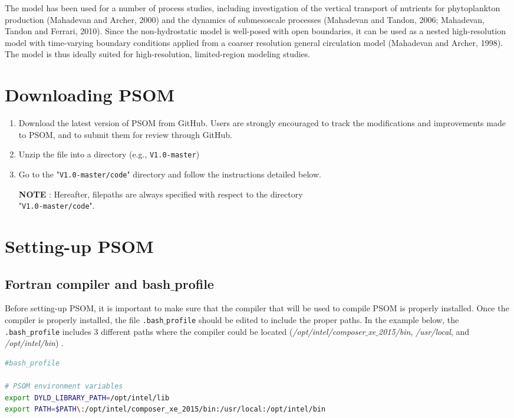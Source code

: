 \documentclass[12pt,letterpaper,titlepage]{article}
\begin{document}
The model has been used for a number of process studies, including investigation of the vertical transport of nutrients for phytoplankton production (Mahadevan and Archer, 2000) and the dynamics of submesoscale processes (Mahadevan and Tandon, 2006; Mahadevan, Tandon and Ferrari, 2010). Since the non-hydrostatic model is well-posed with open boundaries, it can be used as a nested high-resolution model with time-varying boundary conditions applied from a coarser resolution general circulation model (Mahadevan and Archer, 1998). The model is thus ideally suited for high-resolution, limited-region modeling studies. 


\section{Downloading PSOM}

\begin{enumerate}
\item Download the latest version of PSOM from GitHub. Users are strongly encouraged to track the modifications and improvements made to PSOM, and to submit them for review through GitHub.
\item Unzip the file into a directory (e.g., \texttt{V1.0-master})
\item Go to the "\texttt{V1.0-master/code}" directory and follow the instructions detailed below.
\end{enumerate}

\begin{itemize}
	\item[\textbf{NOTE}]: Hereafter, filepaths are always specified with respect to the directory\\ "\texttt{V1.0-master/code}".
\end{itemize}


\section{Setting-up PSOM}

\subsection{Fortran compiler and bash$\_$profile}

Before setting-up PSOM, it is important to make sure that the compiler that will be used to compile PSOM is properly installed. Once the compiler is properly installed, the file \texttt{.bash$\_$profile} should be edited to include the proper paths. In the example below, the \texttt{.bash\_profile} includes 3 different paths where the compiler could be located (\textsl{/opt/intel/composer$\_$xe$\_$2015/bin}, \textsl{/usr/local}, and \textsl{/opt/intel/bin})
.
\begin{lstlisting}[language=sh, breaklines]
#bash_profile

# PSOM environment variables
export DYLD_LIBRARY_PATH=/opt/intel/lib
export PATH=$PATH\:/opt/intel/composer_xe_2015/bin:/usr/local:/opt/intel/bin

\end{lstlisting}
\end{document}
